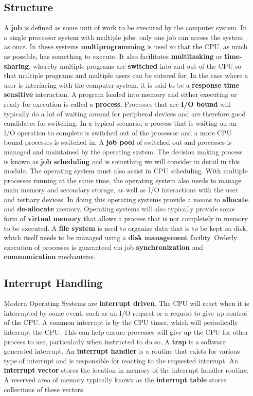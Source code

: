 \documentclass[10pt,a4paper]{article}
\begin{document}
\subsection{Structure}
A {\bf job} is defined as some unit of work to be executed by the computer system. In a single processor system with multiple jobs, only one job can access the system as once. In these systems {\bf multiprogramming} is used so that the CPU, as much as possible, has something to execute. It also facilitates {\bf multitasking} or {\bf time-sharing}, whereby multiple programs are {\bf switched} into and out of the CPU so that multiple programs and multiple users can be catered for. In the case where a user is interfacing with the computer system, it is said to be a {\bf response time sensitive} interaction. A program loaded into memory and either executing or ready for execution is called a {\bf process}. Processes that are {\bf I/O bound} will typically do a lot of waiting around for peripheral devices and are therefore good candidates for switching. In a typical scenario, a process that is waiting on an I/O operation to complete is switched out of the processor and a more CPU bound processes is switched in. A {\bf job pool} of switched out and processes is managed and maintained by the operating system. The decision making process is known as {\bf job scheduling} and is something we will consider in detail in this module. 
\newline\newline
The operating system must also assist in CPU scheduling. With multiple processes running at the same time, the operating system also needs to manage main memory and secondary storage, as well as I/O interactions with the user and tertiary devices. In doing this operating systems provide a means to {\bf allocate} and {\bf de-allocate} memory. Operating systems will also typically provide some form of {\bf virtual memory} that allows a process that is not completely in memory to be executed. A {\bf file system} is used to organise data that is to be kept on disk, which itself needs to be managed using a {\bf disk management} facility. Orderly execution of processes is guaranteed via job {\bf synchronization} and {\bf communication} mechanisms. 
\subsection{Interrupt Handling}
Modern Operating Systems are {\bf interrupt driven}. The CPU will react when it is interrupted by some event, such as an I/O request or a request to give up control of the CPU. A common interrupt is by the CPU timer, which will periodically interrupt the CPU. This can help ensure processes will give up the CPU for other process to use, particularly when instructed to do so. A {\bf trap} is a software generated interrupt. An {\bf interrupt handler} is a routine that exists for various type of interrupt and is responsible for reacting to the requested interrupt. An {\bf interrupt vector} stores the location in memory of the interrupt handler routine. A reserved area of memory typically known as the {\bf interrupt table} stores collections of these vectors. 
\end{document}
